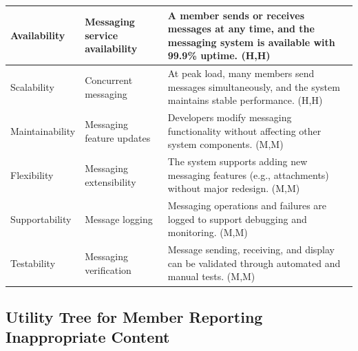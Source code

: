 \documentclass{article}
\begin{document}
\begin{table}[H]
\begin{tabular}{|p{3cm}|p{4cm}|p{7cm}|}
        Availability
                                   & Messaging service availability
                                   & A member sends or receives messages at any time, and the messaging system is available with 99.9\% uptime. (H,H)                                 \\
        \hline

        Scalability
                                   & Concurrent messaging
                                   & At peak load, many members send messages simultaneously, and the system maintains stable performance. (H,H)                                      \\
        \hline

        Maintainability
                                   & Messaging feature updates
                                   & Developers modify messaging functionality without affecting other system components. (M,M)                                                       \\
        \hline

        Flexibility
                                   & Messaging extensibility
                                   & The system supports adding new messaging features (e.g., attachments) without major redesign. (M,M)                                              \\
        \hline

        Supportability
                                   & Message logging
                                   & Messaging operations and failures are logged to support debugging and monitoring. (M,M)                                                          \\
        \hline

        Testability
                                   & Messaging verification
                                   & Message sending, receiving, and display can be validated through automated and manual tests. (M,M)                                               \\
        \hline
    \end{tabular}
\end{table}

\subsection{Utility Tree for Member Reporting Inappropriate Content}
\end{document}
